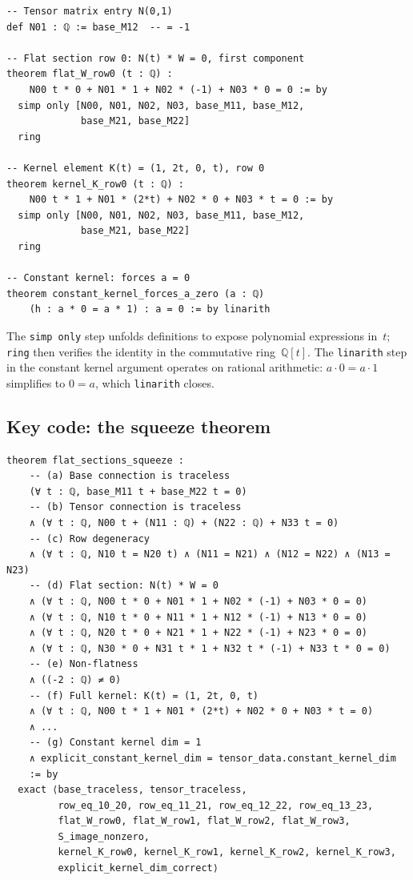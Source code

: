 \documentclass[11pt]{article}
\theoremstyle{plain}
\theoremstyle{definition}
\theoremstyle{remark}
\newcommand{\Q}{\mathbb{Q}}
\begin{document}
\begin{lstlisting}
-- Tensor matrix entry N(0,1)
def N01 : ℚ := base_M12  -- = -1

-- Flat section row 0: N(t) * W = 0, first component
theorem flat_W_row0 (t : ℚ) :
    N00 t * 0 + N01 * 1 + N02 * (-1) + N03 * 0 = 0 := by
  simp only [N00, N01, N02, N03, base_M11, base_M12,
             base_M21, base_M22]
  ring

-- Kernel element K(t) = (1, 2t, 0, t), row 0
theorem kernel_K_row0 (t : ℚ) :
    N00 t * 1 + N01 * (2*t) + N02 * 0 + N03 * t = 0 := by
  simp only [N00, N01, N02, N03, base_M11, base_M12,
             base_M21, base_M22]
  ring

-- Constant kernel: forces a = 0
theorem constant_kernel_forces_a_zero (a : ℚ)
    (h : a * 0 = a * 1) : a = 0 := by linarith
\end{lstlisting}

The \texttt{simp only} step unfolds definitions to expose
polynomial expressions in~$t$; \texttt{ring} then verifies the
identity in the commutative ring~$\Q[t]$.  The
\texttt{linarith} step in the constant kernel argument operates
on rational arithmetic: $a \cdot 0 = a \cdot 1$ simplifies to
$0 = a$, which \texttt{linarith} closes.

\subsection{Key code: the squeeze theorem}

\begin{lstlisting}
theorem flat_sections_squeeze :
    -- (a) Base connection is traceless
    (∀ t : ℚ, base_M11 t + base_M22 t = 0)
    -- (b) Tensor connection is traceless
    ∧ (∀ t : ℚ, N00 t + (N11 : ℚ) + (N22 : ℚ) + N33 t = 0)
    -- (c) Row degeneracy
    ∧ (∀ t : ℚ, N10 t = N20 t) ∧ (N11 = N21) ∧ (N12 = N22) ∧ (N13 = N23)
    -- (d) Flat section: N(t) * W = 0
    ∧ (∀ t : ℚ, N00 t * 0 + N01 * 1 + N02 * (-1) + N03 * 0 = 0)
    ∧ (∀ t : ℚ, N10 t * 0 + N11 * 1 + N12 * (-1) + N13 * 0 = 0)
    ∧ (∀ t : ℚ, N20 t * 0 + N21 * 1 + N22 * (-1) + N23 * 0 = 0)
    ∧ (∀ t : ℚ, N30 * 0 + N31 t * 1 + N32 t * (-1) + N33 t * 0 = 0)
    -- (e) Non-flatness
    ∧ ((-2 : ℚ) ≠ 0)
    -- (f) Full kernel: K(t) = (1, 2t, 0, t)
    ∧ (∀ t : ℚ, N00 t * 1 + N01 * (2*t) + N02 * 0 + N03 * t = 0)
    ∧ ...
    -- (g) Constant kernel dim = 1
    ∧ explicit_constant_kernel_dim = tensor_data.constant_kernel_dim
    := by
  exact ⟨base_traceless, tensor_traceless,
         row_eq_10_20, row_eq_11_21, row_eq_12_22, row_eq_13_23,
         flat_W_row0, flat_W_row1, flat_W_row2, flat_W_row3,
         S_image_nonzero,
         kernel_K_row0, kernel_K_row1, kernel_K_row2, kernel_K_row3,
         explicit_kernel_dim_correct⟩
\end{lstlisting}
\end{document}
